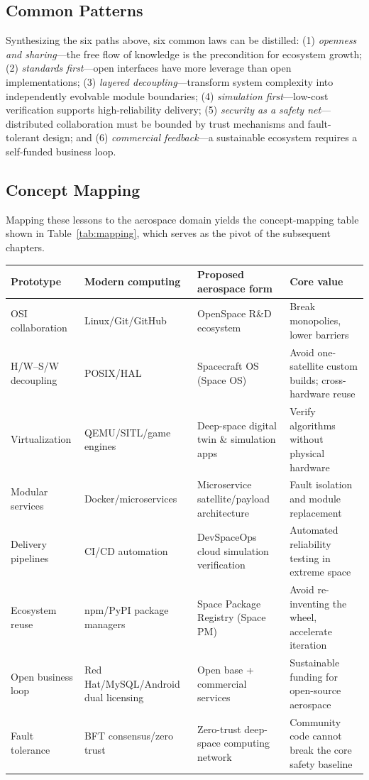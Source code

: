 \documentclass[11pt]{article}
\begin{document}
\subsection{Common Patterns}
Synthesizing the six paths above, six common laws can be distilled: (1) \emph{openness and sharing}---the free flow of knowledge is the precondition for ecosystem growth; (2) \emph{standards first}---open interfaces have more leverage than open implementations; (3) \emph{layered decoupling}---transform system complexity into independently evolvable module boundaries; (4) \emph{simulation first}---low-cost verification supports high-reliability delivery; (5) \emph{security as a safety net}---distributed collaboration must be bounded by trust mechanisms and fault-tolerant design; and (6) \emph{commercial feedback}---a sustainable ecosystem requires a self-funded business loop.

\subsection{Concept Mapping}
Mapping these lessons to the aerospace domain yields the concept-mapping table shown in Table~\ref{tab:mapping}, which serves as the pivot of the subsequent chapters.

\begin{landscape}
\vfill
\centering
{}
\label{tab:mapping}
\begin{tabularx}{\textheight}{@{}>{\raggedright\arraybackslash}X>{\raggedright\arraybackslash}X>{\raggedright\arraybackslash}X>{\raggedright\arraybackslash}X@{}}
\toprule
Prototype & Modern computing & Proposed aerospace form & Core value \\
\midrule
OSI collaboration & Linux/Git/GitHub & OpenSpace R\&D ecosystem & Break monopolies, lower barriers \\
H/W--S/W decoupling & POSIX/HAL & Spacecraft OS (Space OS) & Avoid one-satellite custom builds; cross-hardware reuse \\
Virtualization & QEMU/SITL/game engines & Deep-space digital twin \& simulation apps & Verify algorithms without physical hardware \\
Modular services & Docker/microservices & Microservice satellite/payload architecture & Fault isolation and module replacement \\
Delivery pipelines & CI/CD automation & DevSpaceOps cloud simulation verification & Automated reliability testing in extreme space \\
Ecosystem reuse & npm/PyPI package managers & Space Package Registry (Space PM) & Avoid re-inventing the wheel, accelerate iteration \\
Open business loop & Red Hat/MySQL/Android dual licensing & Open base + commercial services & Sustainable funding for open-source aerospace \\
Fault tolerance & BFT consensus/zero trust & Zero-trust deep-space computing network & Community code cannot break the core safety baseline \\
\bottomrule
\end{tabularx}
\vfill
\end{landscape}
\end{document}
